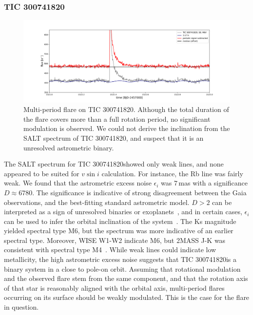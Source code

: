 \documentclass[fleqn,usenatbib,letters]{mnras}%
\newcommand{\FF}{TIC 300741820} %
\begin{document}
\subsubsection{\FF}
\label{sec:propsF}
\begin{figure}
	\includegraphics[width=\columnwidth]{figures/300741820_s8_sinusoidal.png}
    \caption{Multi-period flare on \FF. Although the total duration of the flare covers more than a full rotation period, no significant modulation is observed. We could not derive the inclination from the SALT spectrum of \FF, and suspect that it is an unresolved astrometric binary.}
    \label{fig:\FF}
\end{figure}
The SALT spectrum for \FF showed only weak lines, and none appeared to be suited for $v \sin i$ calculation. For instance, the Rb line was fairly weak. We found that the astrometric excess noise $\epsilon_i$ was $7$\,mas with a significance $D\approx6780$. The significance is indicative of strong disagreement between the Gaia observations, and the best-fitting standard astrometric model. $D>2$ can be interpreted as a sign of unresolved binaries or exoplanets~\citep{lindegren2012}, and in certain cases, $\epsilon_i$ can be used to infer the orbital inclination of the system~\citep{kiefer2019a, kiefer2019b}. The Ks magnitude yielded spectral type M6, but the spectrum was more indicative of an earlier spectral type. Moreover, WISE W1-W2 indicate M6, but 2MASS J-K was consistent with spectral type M4~\citep{pecaut2013}. While weak lines could indicate low metallicity, the high astrometric excess noise suggests that \FF is a binary system in a close to pole-on orbit. Assuming that rotational modulation and the observed flare stem from the same component, and that the rotation axis of that star is reasonably aligned with the orbital axis, multi-period flares occurring on its surface should be weakly modulated. This is the case for the flare in question.
\end{document}
